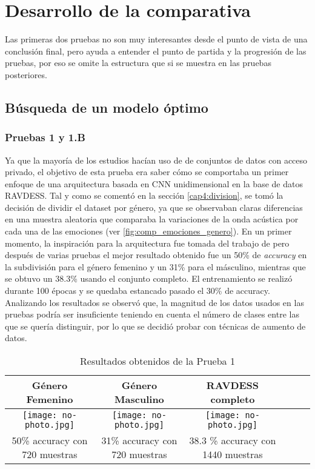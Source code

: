 \documentclass[11pt,a4paper,spanish]{book}
\begin{document}
	\chapter{Desarrollo de la comparativa}
	Las primeras dos pruebas no son muy interesantes desde el punto de vista de una conclusión final, pero ayuda a entender el punto de partida y la progresión de las pruebas, por eso se omite la estructura que si se muestra en las pruebas posteriores.
	\section{Búsqueda de un  modelo óptimo}
	\label{cap:4ModeloOptimo}
		\subsection{Pruebas 1 y 1.B}
		Ya que la mayoría de los estudios hacían uso de de conjuntos de datos con acceso privado, el objetivo de esta prueba era saber cómo se comportaba un primer enfoque de una arquitectura basada en CNN unidimensional en la base de datos RAVDESS. Tal y como se comentó en la sección \ref{cap4:division}, se tomó la decisión de dividir el dataset por género, ya que se observaban claras diferencias en una muestra aleatoria que comparaba la variaciones de la onda acústica por cada una de las emociones (ver \ref{fig:comp_emociones_genero}). En un primer momento, la inspiración para la arquitectura fue tomada del trabajo de \cite{blabla} pero después de varias pruebas el mejor resultado obtenido fue un 50\% de \emph{accuracy} en la subdivisión para el género femenino y un 31\% para el másculino, mientras que se obtuvo un 38.3\% usando el conjunto completo. El entrenamiento se realizó durante 100 épocas y se quedaba estancado pasado el 30\% de accuracy. Analizando los resultados se observó que, la magnitud de los datos usados en las pruebas podría ser insuficiente teniendo en cuenta el número de clases entre las que se quería distinguir, por lo que se decidió probar con técnicas de aumento de datos.
		\begin{table}[H]
			\centering
			\begin{center}
				\begin{tabular}{| c | c | c | c | c | c |}
					\hline
					Género Femenino & Género Masculino & RAVDESS completo \\ 
					\hline
					\texttt{[image: no-photo.jpg]} & \texttt{[image: no-photo.jpg]} & \texttt{[image: no-photo.jpg]}\\
					\hline
					50\% accuracy con 720 muestras & 31\%  accuracy con 720 muestras & 38.3 \% accuracy con 1440 muestras \\
					\hline	
				\end{tabular}
				\caption{Resultados obtenidos de la Prueba 1}
			\end{center}
		\end{table}
	
\end{document}
